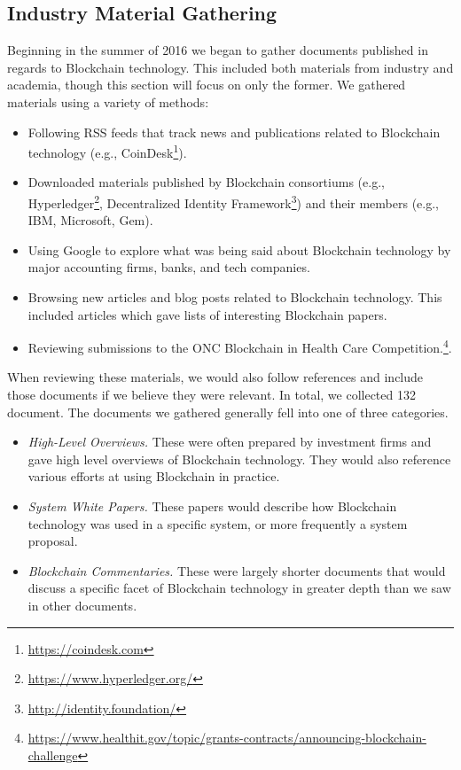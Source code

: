 \subsection{Industry Material Gathering}
Beginning in the summer of 2016 we began to gather documents published in regards to Blockchain technology.
This included both materials from industry and academia, though this section will focus on only the former.
We gathered materials using a variety of methods:

\begin{itemize}
	\item Following RSS feeds that track news and publications related to Blockchain technology (e.g., CoinDesk\footnote{\url{https://coindesk.com}}).
	\item Downloaded materials published by Blockchain consortiums (e.g., Hyperledger\footnote{\url{https://www.hyperledger.org/}}, Decentralized Identity Framework\footnote{\url{http://identity.foundation/}}) and their members (e.g., IBM, Microsoft, Gem).
	\item Using Google to explore what was being said about Blockchain technology by major accounting firms, banks, and tech companies.
	\item Browsing new articles and blog posts related to Blockchain technology. This included articles which gave lists of interesting Blockchain papers.
	\item Reviewing submissions to the ONC Blockchain in Health Care Competition.\footnote{\url{https://www.healthit.gov/topic/grants-contracts/announcing-blockchain-challenge}}.
\end{itemize}

When reviewing these materials, we would also follow references and include those documents if we believe they were relevant.
In total, we collected 132 document.
The documents we gathered generally fell into one of three categories.

\begin{itemize}
	\item \emph{High-Level Overviews.} These were often prepared by investment firms and gave high level overviews of Blockchain technology. They would also reference various efforts at using Blockchain in practice.
	\item \emph{System White Papers.} These papers would describe how Blockchain technology was used in a specific system, or more frequently a system proposal.
	\item \emph{Blockchain Commentaries.} These were largely shorter documents that would discuss a specific facet of Blockchain technology in greater depth than we saw in other documents.
\end{itemize}

